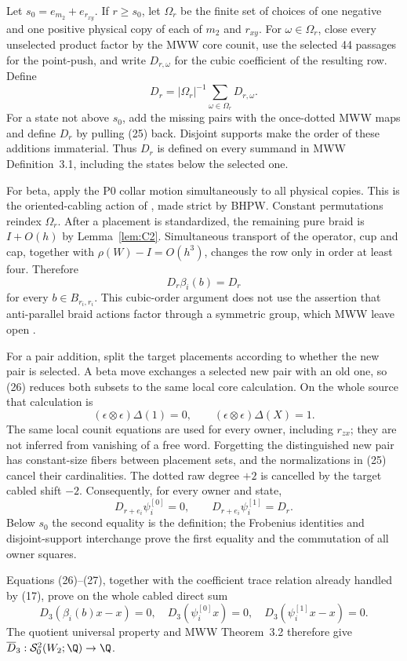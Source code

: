 Let $s_0=e_{m_2}+e_{r_{xy}}$.  If $r\ge s_0$, let $\Omega_r$ be the finite set
of choices of one negative and one positive physical copy of each of $m_2$
and $r_{xy}$.  For $\omega\in\Omega_r$, close every unselected product factor
by the MWW core counit, use the selected 44 passages for the point-push, and
write $D_{r,\omega}$ for the cubic coefficient of the resulting row.  Define
\[
D_r=|\Omega_r|^{-1}\sum_{\omega\in\Omega_r}D_{r,\omega}.
\tag{25}
\]
For a state not above $s_0$, add the missing pairs with the once-dotted MWW
maps and define $D_r$ by pulling (25) back.  Disjoint supports make the order
of these additions immaterial.  Thus $D_r$ is defined on
every summand in
MWW Definition~3.1, including the states below the selected one.

For beta, apply the P0 collar motion simultaneously to all physical copies.
This is the oriented-cabling action of
\cite[Theorem~E]{BeliakovaPutyraWehrli2019}, made strict by BHPW.  Constant
permutations reindex $\Omega_r$.  After a placement is standardized, the
remaining pure braid is \(I+O(h)\) by Lemma~\ref{lem:C2}.  Simultaneous transport of the
operator, cup and cap, together with $\rho(W)-I=O(h^3)$, changes the row only
in order at least four.  Therefore
\[
D_r\beta_i(b)=D_r
\tag{26}
\]
for every $b\in B_{r_i,r_i}$.  This cubic-order argument does not use the
assertion that anti-parallel braid actions factor through a symmetric group,
which MWW leave open
\cite[Remark~3.3]{ManolescuWalkerWedrich2023}.

For a pair addition, split the target placements according to whether the
new pair is selected.  A beta move exchanges a selected new pair with an old
one, so (26) reduces both subsets to the same local core calculation.  On the
whole source that calculation is
\[
(\epsilon\otimes\epsilon)\Delta(1)=0,\qquad
(\epsilon\otimes\epsilon)\Delta(X)=1.
\]
The same local counit equations are used for every owner, including
$r_{zx}$; they are not inferred from vanishing of a free word.  Forgetting the distinguished new pair has constant-size fibers
between placement sets, and the normalizations in (25) cancel their
cardinalities.  The dotted raw degree $+2$ is cancelled by the target cabled
shift $-2$.  Consequently, for every owner and state,
\[
D_{r+e_i}\psi_i^{[0]}=0,\qquad
D_{r+e_i}\psi_i^{[1]}=D_r.
\tag{27}
\]
Below $s_0$ the second equality is the definition; the Frobenius identities
and disjoint-support interchange prove the first equality and the commutation
of all owner squares.

Equations (26)--(27), together with the coefficient trace relation already
handled by (17), prove on the whole cabled direct sum
\[
D_3(\beta_i(b)x-x)=0,\quad
D_3(\psi_i^{[0]}x)=0,\quad
D_3(\psi_i^{[1]}x-x)=0.
\]
The quotient universal property and MWW Theorem~3.2 therefore give
$\overline D_3:\mathcal S^2_0(W_2;\Q)\to\Q$.

